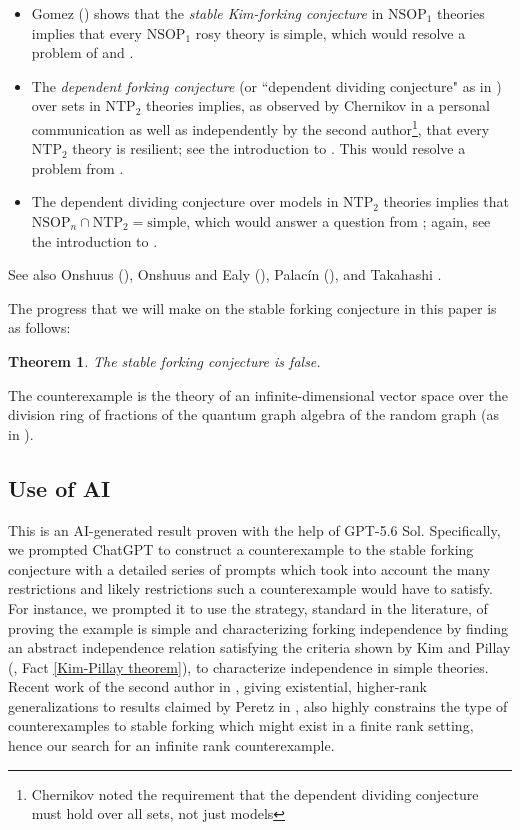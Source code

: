 \documentclass{amsart}
\newtheorem{theorem}{Theorem}[section]
\theoremstyle{definition}
\theoremstyle{remark}
\numberwithin{equation}{section}
\begin{document}
\begin{itemize}
    \item Gomez (\cite{GomezRosyTheories}) shows that the \textit{stable Kim-forking conjecture} in $\mathrm{NSOP}_{1}$ theories implies that every $\mathrm{NSOP}_{1}$ rosy theory is simple, which would resolve a problem of \cite{D19} and \cite{K21}.

    \item The \textit{dependent forking conjecture} (or ``dependent dividing conjecture" as in \cite{Che14}) over sets in $\mathrm{NTP}_{2}$ theories implies, as observed by Chernikov in a personal communication as well as independently by the second author\footnote{Chernikov noted the requirement that the dependent dividing conjecture must hold over all sets, not just models}, that every $\mathrm{NTP}_{2}$ theory is resilient;  see the introduction to \cite{MutchnikReducing}. This would resolve a problem from \cite{BYC07}.

    \item The dependent dividing conjecture over models in $\mathrm{NTP}_{2}$ theories implies that $\mathrm{NSOP}_{n} \cap \mathrm{NTP}_{2} = \mathrm{simple}$, which would answer a question from \cite{Che14}; again, see the introduction to \cite{MutchnikReducing}.
\end{itemize}

See also Onshuus (\cite{Ons06}), Onshuus and Ealy (\cite{ealy2016thorn}), Palacín (\cite{palacin2012omega}), and Takahashi \cite{TakahashiConsequences}.

The progress that we will make on the stable forking conjecture in this paper is as follows:

\begin{theorem}
    The stable forking conjecture is false.
\end{theorem}

 The counterexample is the theory of an infinite-dimensional vector space over the division ring of fractions of the quantum graph algebra of the random graph (as in \cite{Goodearl2024Binomial}).


\subsection{Use of AI}
This is an AI-generated result proven with the help of GPT-5.6 Sol. Specifically, we prompted ChatGPT to construct a counterexample to the stable forking conjecture with a detailed series of prompts which took into account the many restrictions and likely restrictions such a counterexample would have to satisfy. For instance, we prompted it to use the strategy, standard in the literature, of proving the example is simple and characterizing forking independence by finding an abstract independence relation satisfying the criteria shown by Kim and Pillay (\cite{KP99}, Fact \ref{Kim-Pillay theorem}), to characterize independence in simple theories. Recent work of the second author in \cite{MutchnikReducing}, giving existential, higher-rank generalizations to results claimed by Peretz in \cite{Per06}, also highly constrains the type of counterexamples to stable forking which might exist in a finite rank setting, hence our search for an infinite rank counterexample. 
\end{document}
